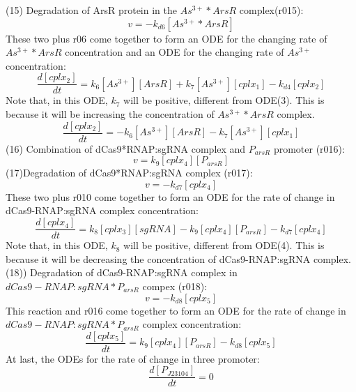 (15) Degradation of ArsR protein in the  $As^{3+}*ArsR$ complex(r015):
\begin{displaymath}
v=-k_{d6}[As^{3+}*ArsR]
\end{displaymath}
These two plus r06 come together to form an ODE for the changing rate of $As^{3+}*ArsR$  concentration and an ODE for the changing rate of $As^{3+}$ concentration:
\begin{equation}
\frac{d[cplx_2]}{dt}=k_{6}[As^{3+}][ArsR]+k_7[As^{3+}][cplx_1]-k_{d4}[cplx_2] \tag{6}
\end{equation}
Note that, in this ODE, $k_7$ will be positive, different from ODE(3). This is because it will be increasing the concentration of  $As^{3+}*ArsR$ complex.\\
\begin{equation}
\frac{d[cplx_2]}{dt}=-k_{6}[As^{3+}][ArsR]-k_7[As^{3+}][cplx_1] \tag{7}
\end{equation}
(16) Combination of dCas9*RNAP:sgRNA complex and $P_{arsR}$ promoter (r016):
\begin{displaymath}
v=k_{9}[cplx_4][P_{arsR}]
\end{displaymath}
(17)Degradation of dCas9*RNAP:sgRNA complex (r017): 
\begin{displaymath}
v=-k_{d7}[cplx_4]
\end{displaymath}
These two plus r010 come together to form an ODE for the rate of change in dCas9-RNAP:sgRNA complex concentration:
\begin{equation}
\frac{d[cplx_4]}{dt}=k_{8}[cplx_3][sgRNA]-k_{9}[cplx_4][P_{arsR}]-k_{d7}[cplx_4]\tag{8}
\end{equation}
Note that, in this ODE, $k_8$ will be positive, different from ODE(4). This is because it will be decreasing the concentration of dCas9-RNAP:sgRNA complex.\\
(18)) Degradation of dCas9-RNAP:sgRNA complex in $dCas9-RNAP:sgRNA*P_{arsR}$ compex (r018):
\begin{displaymath}
v=-k_{d8}[cplx_5]
\end{displaymath}
This reaction and r016 come together to form an ODE for the rate of change in $dCas9-RNAP:sgRNA*P_{arsR}$ complex concentration:
\begin{equation}
\frac{d[cplx_5]}{dt}=k_{9}[cplx_4][P_{arsR}]-k_{d8}[cplx_5]\tag{9}
\end{equation} 
At last, the ODEs for the rate of change in three promoter:
\begin{equation}
\frac{d[P_{J23104}]}{dt}=0\tag{10}
\end{equation} 

